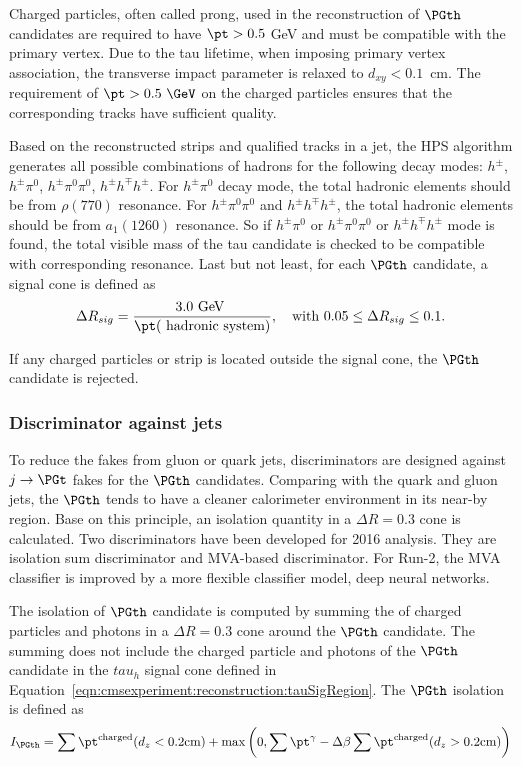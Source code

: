 Charged particles, often called prong, used in the reconstruction of $\PGth$ candidates are required to have $\pt>0.5$ GeV and must be compatible with the primary vertex. Due to the tau lifetime, when imposing primary vertex association, the transverse impact parameter is relaxed to $d_{xy}<0.1$~cm. The requirement of $\pt > 0.5~\GeV$ on the charged particles ensures that the corresponding tracks have sufficient quality.

Based on the reconstructed strips and qualified tracks in a jet, the HPS algorithm generates all possible combinations of hadrons for the following decay modes: $h^\pm$, $h^\pm \pi^0$, $h^\pm \pi^0 \pi^0$, $h^\pm h^\mp h^\pm$. For $h^\pm \pi^0$ decay mode, the total hadronic elements should be from $\rho(770)$ resonance. For $h^\pm \pi^0 \pi^0$ and $h^\pm h^\mp h^\pm$, the total hadronic elements should be from $a_1(1260)$ resonance. So if $h^\pm \pi^0$ or $h^\pm \pi^0 \pi^0$ or $h^\pm h^\mp h^\pm$ mode is found, the total visible mass of the tau candidate is checked to be compatible with corresponding resonance. Last but not least, for each $\PGth$ candidate, a signal cone is defined as
\begin{equation}
	\Delta R_{sig} = \frac{3.0 \text{ GeV } } { \pt (\text{ hadronic system})  }, \quad \text{with } 0.05 \leq \Delta R_{sig} \leq 0.1.
	\label{eqn:cmsexperiment:reconstruction:tauSigRegion}
\end{equation}

\noindent If any charged particles or strip is located outside the signal cone, the $\PGth$ candidate is rejected.

\subsubsection{Discriminator against jets}

To reduce the fakes from gluon or quark jets, discriminators are designed against $j\to \PGt$ fakes for the $\PGth$ candidates. Comparing with the quark and gluon jets, the $\PGth$ tends to have a cleaner calorimeter environment in its near-by region. Base on this principle, an isolation quantity in a $\Delta R = 0.3$ cone is calculated. Two discriminators have been developed for 2016 analysis. They are isolation sum discriminator and MVA-based discriminator. For Run-2, the MVA classifier is improved by a more flexible classifier model, deep neural networks. 

The isolation of $\PGth$ candidate is computed by summing the \pt of charged particles and photons in a $\Delta R = 0.3$ cone around the $\PGth$ candidate. The summing does not include the charged particle and photons of the $\PGth$ candidate in the $tau_h$ signal cone defined in Equation~\ref{eqn:cmsexperiment:reconstruction:tauSigRegion}. The $\PGth$ isolation is defined as
\begin{equation}
	I_{\PGth} = \sum \pt^{\text{charged}} (d_z<0.2 \text{cm}) + \max \bigg( 0, \sum \pt^ \gamma - \Delta \beta \sum \pt^{\text{charged}} (d_z>0.2 \text{cm})  \bigg )
    \label{eqn:cmsexperiment:reconstruction:tauIso}
\end{equation}


